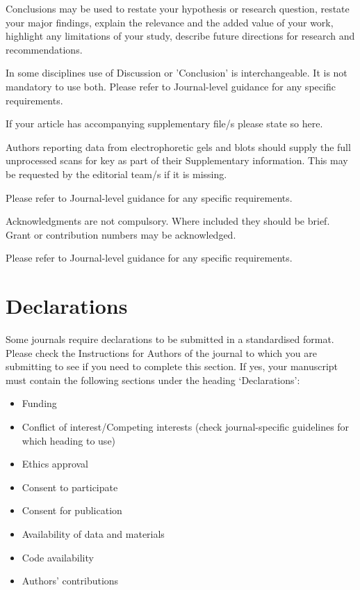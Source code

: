 \documentclass[sn-nature]{sn-jnl}%
\theoremstyle{thmstyleone}%
\theoremstyle{thmstyletwo}%
\theoremstyle{thmstylethree}%
\begin{document}
Conclusions may be used to restate your hypothesis or research question, restate your major findings, explain the relevance and the added value of your work, highlight any limitations of your study, describe future directions for research and recommendations. 

In some disciplines use of Discussion or 'Conclusion' is interchangeable. It is not mandatory to use both. Please refer to Journal-level guidance for any specific requirements. 

\backmatter


If your article has accompanying supplementary file/s please state so here. 

Authors reporting data from electrophoretic gels and blots should supply the full unprocessed scans for key as part of their Supplementary information. This may be requested by the editorial team/s if it is missing.

Please refer to Journal-level guidance for any specific requirements.


Acknowledgments are not compulsory. Where included they should be brief. Grant or contribution numbers may be acknowledged.

Please refer to Journal-level guidance for any specific requirements.

\section*{Declarations}

Some journals require declarations to be submitted in a standardised format. Please check the Instructions for Authors of the journal to which you are submitting to see if you need to complete this section. If yes, your manuscript must contain the following sections under the heading `Declarations':

\begin{itemize}
\item Funding
\item Conflict of interest/Competing interests (check journal-specific guidelines for which heading to use)
\item Ethics approval 
\item Consent to participate
\item Consent for publication
\item Availability of data and materials
\item Code availability 
\item Authors' contributions
\end{itemize}
\end{document}
